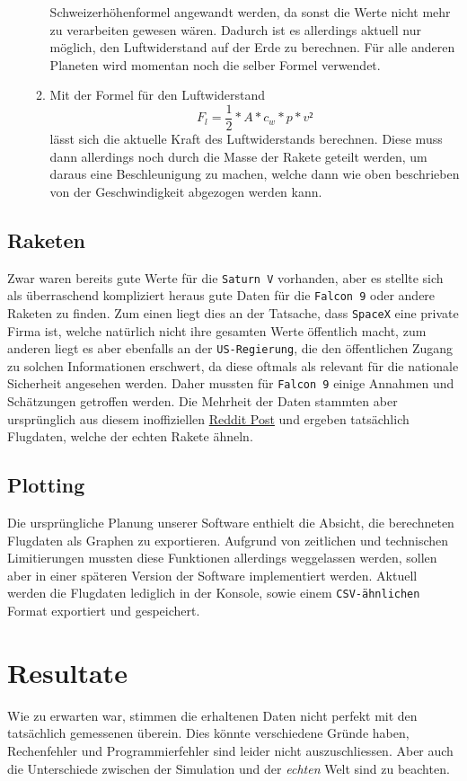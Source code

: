 \documentclass[11pt]{article}
\begin{document}
\begin{enumerate}
\begin{enumerate}
Schweizerhöhenformel angewandt werden, da sonst die Werte nicht mehr zu
verarbeiten gewesen wären. Dadurch ist es allerdings aktuell nur möglich,
den Luftwiderstand auf der Erde zu berechnen. Für alle anderen Planeten
wird momentan noch die selber Formel verwendet.
\item Mit der Formel für den Luftwiderstand \[F_l = \frac{1}{2} * A * c_w * p *
      v²\] lässt sich die aktuelle Kraft des Luftwiderstands berechnen. Diese
muss dann allerdings noch durch die Masse der Rakete geteilt werden, um
daraus eine Beschleunigung zu machen, welche dann wie oben beschrieben von
der Geschwindigkeit abgezogen werden kann.
\end{enumerate}
\end{enumerate}
\subsection{Raketen}
\label{sec:orge5135a9}
Zwar waren bereits gute Werte für die \texttt{Saturn V} vorhanden, aber es stellte sich
als überraschend kompliziert heraus gute Daten für die \texttt{Falcon 9} oder andere
Raketen zu finden. Zum einen liegt dies an der Tatsache, dass \texttt{SpaceX} eine
private Firma ist, welche natürlich nicht ihre gesamten Werte öffentlich macht,
zum anderen liegt es aber ebenfalls an der \texttt{US-Regierung}, die den öffentlichen
Zugang zu solchen Informationen erschwert, da diese oftmals als relevant für die
nationale Sicherheit angesehen werden. Daher mussten für \texttt{Falcon 9} einige
Annahmen und Schätzungen getroffen werden. Die Mehrheit der Daten stammten aber
ursprünglich aus diesem inoffiziellen \href{https://www.reddit.com/r/spacex/comments/3lsm0q/f9ft\_vs\_f9v11\_fuel\_mass\_flow\_rate\_isp/}{Reddit Post} und ergeben tatsächlich
Flugdaten, welche der echten Rakete ähneln.
\subsection{Plotting}
\label{sec:orgbe9a2d7}
Die ursprüngliche Planung unserer Software enthielt die Absicht, die
berechneten Flugdaten als Graphen zu exportieren. Aufgrund von zeitlichen und
technischen Limitierungen mussten diese Funktionen allerdings weggelassen
werden, sollen aber in einer späteren Version der Software implementiert werden.
Aktuell werden die Flugdaten lediglich in der Konsole, sowie einem \texttt{CSV-ähnlichen}
Format exportiert und gespeichert.
\section{Resultate}
\label{sec:org893dc43}
Wie zu erwarten war, stimmen die erhaltenen Daten nicht perfekt mit den
tatsächlich gemessenen überein. Dies könnte verschiedene Gründe haben,
Rechenfehler und Programmierfehler sind leider nicht auszuschliessen. Aber auch
die Unterschiede zwischen der Simulation und der \emph{echten} Welt sind zu beachten.
\end{document}
